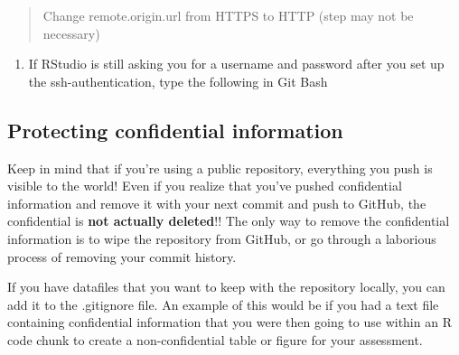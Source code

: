 \documentclass[12pt,]{article}
\providecommand{\tightlist}{%
  \setlength{\itemsep}{0pt}\setlength{\parskip}{0pt}}
\begin{document}
\begin{quote}
Change remote.origin.url from HTTPS to HTTP (step may not be necessary)
\end{quote}

\begin{enumerate}
\def\labelenumi{\arabic{enumi}.}
\setcounter{enumi}{11}
\tightlist
\item
  If RStudio is still asking you for a username and password after you
  set up the ssh-authentication, type the following in Git Bash
\end{enumerate}

\begin{quote}
\colorbox{light-gray}{}
\end{quote}

\begin{quote}
\colorbox{light-gray}{}
\end{quote}

\subsection{Protecting confidential
information}\label{protecting-confidential-information}

Keep in mind that if you're using a public repository, everything you
push is visible to the world! Even if you realize that you've pushed
confidential information and remove it with your next commit and push to
GitHub, the confidential is \textbf{not actually deleted}!! The only way
to remove the confidential information is to wipe the repository from
GitHub, or go through a laborious process of removing your commit
history.

If you have datafiles that you want to keep with the repository locally,
you can add it to the .gitignore file. An example of this would be if
you had a text file containing confidential information that you were
then going to use within an R code chunk to create a non-confidential
table or figure for your assessment.
\end{document}
